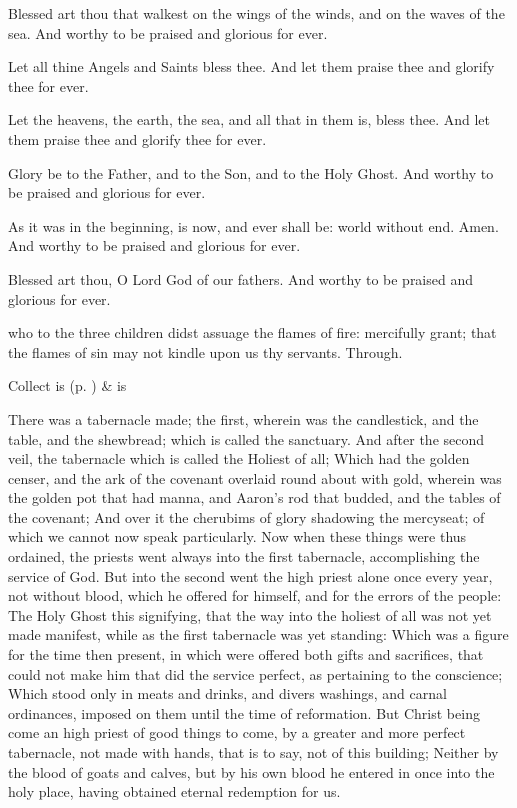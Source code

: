Blessed art thou that walkest on the wings of the winds, and on the waves of the sea. And worthy to be praised and glorious for ever.

Let all thine Angels and Saints bless thee. And let them praise thee and glorify thee for ever.

Let the heavens, the earth, the sea, and all that in them is, bless thee. And let them praise thee and glorify thee for ever.

Glory be to the Father, and to the Son, and to the Holy Ghost. And worthy to be praised and glorious for ever.

As it was in the beginning, is now, and ever shall be: world without end. Amen. And worthy to be praised and glorious for ever.

Blessed art thou, O Lord God of our fathers. And worthy to be praised and glorious for ever.\\


\collect
{} who to the three children didst assuage the flames of fire: mercifully grant; that the flames of sin may not kindle upon us thy servants. Through.
\begin{rubric}
     Collect is  (p. \pageref{SPSaints}) \&  is 
\end{rubric}

 There was a tabernacle made; the first, wherein was the candlestick, and the table, and the shewbread; which is called the sanctuary. And after the second veil, the tabernacle which is called the Holiest of all; Which had the golden censer, and the ark of the covenant overlaid round about with gold, wherein was the golden pot that had manna, and Aaron's rod that budded, and the tables of the covenant; And over it the cherubims of glory shadowing the mercyseat; of which we cannot now speak particularly. Now when these things were thus ordained, the priests went always into the first tabernacle, accomplishing the service of God. But into the second went the high priest alone once every year, not without blood, which he offered for himself, and for the errors of the people: The Holy Ghost this signifying, that the way into the holiest of all was not yet made manifest, while as the first tabernacle was yet standing: Which was a figure for the time then present, in which were offered both gifts and sacrifices, that could not make him that did the service perfect, as pertaining to the conscience; Which stood only in meats and drinks, and divers washings, and carnal ordinances, imposed on them until the time of reformation. But Christ being come an high priest of good things to come, by a greater and more perfect tabernacle, not made with hands, that is to say, not of this building; Neither by the blood of goats and calves, but by his own blood he entered in once into the holy place, having obtained eternal redemption for us.

